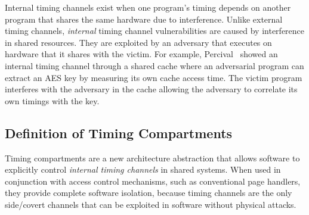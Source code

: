
Internal timing channels exist when one program's timing depends on another
program that shares the same hardware due to interference. Unlike external 
timing channels, {\em internal} timing channel vulnerabilities are caused by 
interference in shared resources.
They are exploited by an adversary that executes on hardware that it shares with 
the victim.
For example, Percival~\cite{percival} showed an internal timing channel
through a shared cache where an adversarial program can extract an AES key
by measuring its own cache access time. The victim program interferes with the 
adversary in the cache allowing the adversary to correlate its own timings with 
the key.

\subsection{Definition of Timing Compartments}

Timing compartments are a new architecture abstraction that allows software to
explicitly control {\em internal timing channels} in shared systems.
When used in conjunction with access
control mechanisms, such as conventional page handlers, they provide complete software 
isolation, because timing channels are the only side/covert channels that can be
exploited in software without physical attacks.

